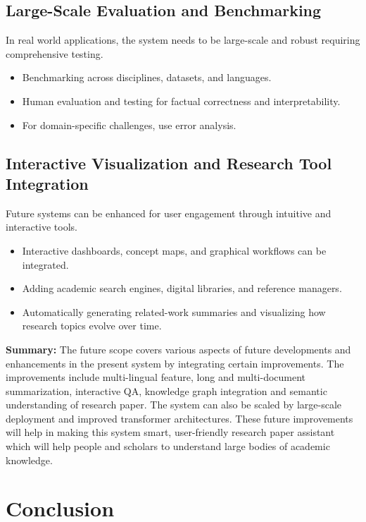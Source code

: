 \documentclass[conference]{IEEEtran}
\begin{document}
\subsection{Large-Scale Evaluation and Benchmarking}
In real world applications, the system needs to be large-scale and robust requiring comprehensive testing.

\begin{itemize}
    \item Benchmarking across disciplines, datasets, and languages.
    \item Human evaluation and testing for factual correctness and interpretability.
    \item For domain-specific challenges, use error analysis.
\end{itemize}

\subsection{Interactive Visualization and Research Tool Integration}
Future systems can be enhanced for user engagement through intuitive and interactive tools.

\begin{itemize}
    \item Interactive dashboards, concept maps, and graphical workflows can be integrated.
    \item Adding academic search engines, digital libraries, and reference managers.
    \item Automatically generating related-work summaries and visualizing how research topics evolve over time. 
\end{itemize}

\noindent\textbf{Summary:} The future scope covers various aspects of future developments and enhancements in the present system by integrating certain improvements. The improvements include multi-lingual feature, long and multi-document summarization, interactive QA, knowledge graph integration and semantic understanding of research paper. The system can also be scaled by large-scale deployment and improved transformer architectures. These future improvements will help in making this system smart, user-friendly research paper assistant which will help people and scholars to understand large bodies of academic knowledge.

\section{Conclusion}
\end{document}
